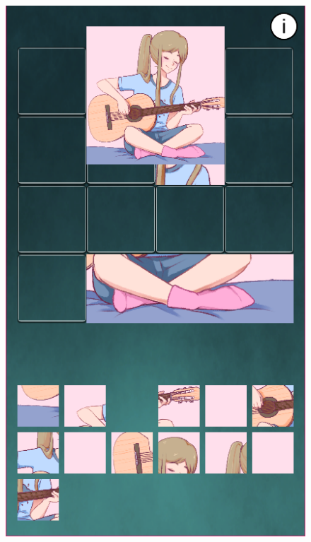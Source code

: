 \documentclass[12pt]{article}
\begin{document}
\begin{figure}[h]
\begin{minipage}{.15\textwidth}
        \includegraphics[width=\textwidth]{imgs/screenshot8.png}
    \end{minipage}
    \begin{minipage}{.15\textwidth}

\end{minipage}
\end{figure}
\end{document}
